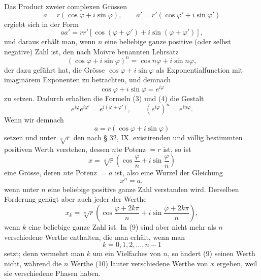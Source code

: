 \documentclass[11pt]{article}
\begin{document}
Das Product zweier complexen Grössen
\[
 a=r(\cos\varphi+i\sin\varphi),\qquad
 a'=r'(\cos\varphi'+i\sin\varphi')
\]
ergiebt sich in der Form
\begin{equation}
 aa'=rr'[\cos(\varphi+\varphi')+i\sin(\varphi+\varphi')],
\tag{3}
\end{equation}
und daraus erhält man, wenn $n$ eine beliebige ganze positive (oder selbst negative) Zahl ist, den nach Moivre benannten Lehrsatz
\begin{equation}
 (\cos\varphi+i\sin\varphi)^n=\cos n\varphi+i\sin n\varphi,
\tag{4}
\end{equation}
der dazu geführt hat, die Grösse $\cos\varphi+i\sin\varphi$ als Exponentialfunction mit imaginärem Exponenten zu betrachten, und demnach
\[
 \cos\varphi+i\sin\varphi=e^{i\varphi}
\]
zu setzen. Dadurch erhalten die Formeln (3) und (4) die Gestalt
\begin{equation}
 e^{i\varphi}e^{i\varphi'}=e^{i(\varphi+\varphi')},\qquad (e^{i\varphi})^n=e^{in\varphi}.
\tag{5}
\end{equation}
Wenn wir demnach
\begin{equation}
 a=r(\cos\varphi+i\sin\varphi)
\tag{6}
\end{equation}
setzen und unter $\sqrt[n]{r}$ den nach § 32, IX. existirenden und völlig bestimmten positiven Werth verstehen, dessen $n$te Potenz $=r$ ist, so ist
\begin{equation}
 x=\sqrt[n]{r}\left(\cos\frac{\varphi}{n}+i\sin\frac{\varphi}{n}\right)
\tag{7}
\end{equation}
eine Grösse, deren $n$te Potenz $=a$ ist, also eine Wurzel der Gleichung
\begin{equation}
 x^n=a,
\tag{8}
\end{equation}
wenn unter $n$ eine beliebige positive ganze Zahl verstanden wird. Derselben Forderung genügt aber auch jeder der Werthe
\begin{equation}
 x_k=\sqrt[n]{r}\left(\cos\frac{\varphi+2k\pi}{n}+i\sin\frac{\varphi+2k\pi}{n}\right),
\tag{9}
\end{equation}
wenn $k$ eine beliebige ganze Zahl ist. In (9) sind aber nicht mehr als $n$ verschiedene Werthe enthalten, die man erhält, wenn man
\begin{equation}
 k=0,1,2,\ldots,n-1
\tag{10}
\end{equation}
setzt; denn vermehrt man $k$ um ein Vielfaches von $n$, so ändert (9) seinen Werth nicht, während die $n$ Werthe (10) lauter verschiedene Werthe von $x$ ergeben, weil sie verschiedene Phasen haben.
\end{document}
